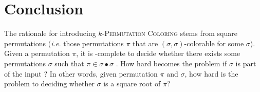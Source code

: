 \section{Conclusion}
\label{section:Conclusion}

The rationale for introducing \textsc{$k$-Permutation Coloring} stems
from square permutations (\emph{i.e.} those permutations $\pi$ that are
$(\sigma, \sigma)$-colorable for some $\sigma$).
Given a permutation $\pi$, it is \NP-complete to decide
whether there exists some permutations $\sigma$ such that
$\pi \in \sigma \bullet \sigma$ \cite{DBLP:journals/tcs/GiraudoV18}.
How hard becomes the problem if $\sigma$ is part of the input ?
In other words, given permutation $\pi$ and $\sigma$, how hard is the problem
to deciding whether $\sigma$ is a square root
of $\pi$?
